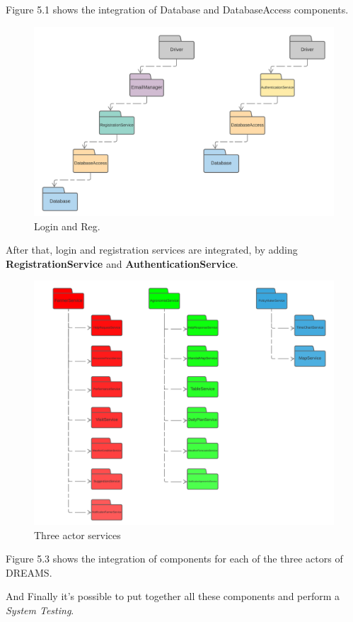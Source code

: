 Figure 5.1 shows the integration of Database and DatabaseAccess components.

\begin{center}
    \begin{figure}[h!]
  \includegraphics[width=\textwidth,height=\textheight,keepaspectratio]{./Images/IntegrationStrategy/IT2.png}
  \caption{Login and Reg.}
\end{figure}
\end{center}

After that, login and registration services are integrated, by adding \textbf{RegistrationService} and \textbf{AuthenticationService}.

\newpage
\begin{center}
    \begin{figure}[h!]
  \includegraphics[width=\textwidth,height=\textheight,keepaspectratio]{./Images/IntegrationStrategy/IT3.png}
  \caption{Three actor services}
\end{figure}
\end{center}

Figure 5.3 shows the integration of components for each of the three actors of DREAMS.

And Finally it's possible to put together all these components and perform a \textit{System Testing}.
\newpage
